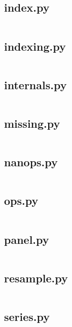 \documentclass{article}
\begin{document}
\subsection{index.py}
\inputminted{python}{/home/dufferzafar/dev/@clones/pandas/pandas/core/index.py}
\newpage

\subsection{indexing.py}
\inputminted{python}{/home/dufferzafar/dev/@clones/pandas/pandas/core/indexing.py}
\newpage

\subsection{internals.py}
\inputminted{python}{/home/dufferzafar/dev/@clones/pandas/pandas/core/internals.py}
\newpage

\subsection{missing.py}
\inputminted{python}{/home/dufferzafar/dev/@clones/pandas/pandas/core/missing.py}
\newpage

\subsection{nanops.py}
\inputminted{python}{/home/dufferzafar/dev/@clones/pandas/pandas/core/nanops.py}
\newpage

\subsection{ops.py}
\inputminted{python}{/home/dufferzafar/dev/@clones/pandas/pandas/core/ops.py}
\newpage

\subsection{panel.py}
\inputminted{python}{/home/dufferzafar/dev/@clones/pandas/pandas/core/panel.py}
\newpage

\subsection{resample.py}
\inputminted{python}{/home/dufferzafar/dev/@clones/pandas/pandas/core/resample.py}
\newpage

\subsection{series.py}
\inputminted{python}{/home/dufferzafar/dev/@clones/pandas/pandas/core/series.py}
\newpage
\end{document}
